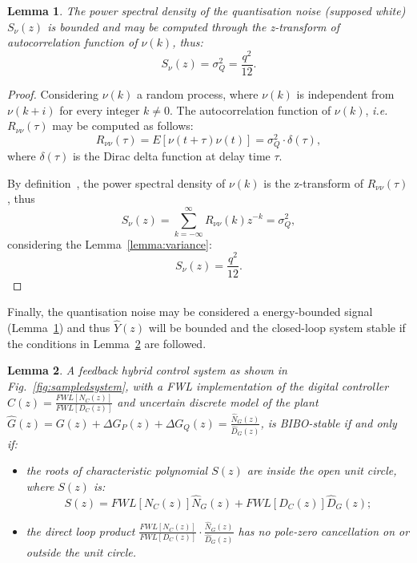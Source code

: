 \documentclass{sig-alternate-05-2015}
\newtheorem{mylemma}{Lemma}
\begin{document}
\begin{mylemma}
\label{lemma:boundednoise}
The power spectral density of the quantisation noise (supposed white) $S_{\nu}(z)$ is bounded and may be computed through the z-transform of autocorrelation function of $\nu(k)$, thus:
\begin{equation}
S_{\nu}(z)= \sigma_{Q}^{2}=\frac{q^{2}}{12}.
\end{equation}
\end{mylemma}

\begin{proof}
Considering $\nu(k)$ a random process, where $\nu(k)$ is independent from $\nu(k+i)$ for every  integer $k\neq 0$. The autocorrelation function of $\nu(k)$, {\it i.e.} $R_{\nu\nu}(\tau)$ may be computed as follows:
\begin{equation}
R_{\nu\nu}(\tau)=E[\nu(t+\tau)\nu(t)]=\sigma_{Q}^{2}\cdot \delta(\tau),
\end{equation}
where $\delta(\tau)$ is the Dirac delta function at delay time $\tau$.

By definition~\cite{poularikas2000transforms}, the power spectral density of  $\nu(k)$ is the z-transform of $R_{\nu\nu}(\tau)$, thus
\begin{equation}
S_{\nu}(z)=  \sum\limits_{k=-\infty}^{\infty}{R_{\nu\nu}(k)z^{-k}} = \sigma_{Q}^{2},
\end{equation}
considering the Lemma~\ref{lemma:variance}:
\begin{equation}
S_{\nu}(z)=  \frac{q^{2}}{12}.
\end{equation}
\end{proof}

Finally, the quantisation noise may be considered a energy-bounded signal (Lemma~\ref{lemma:boundednoise}) and thus $\hat{Y}(z)$ will be bounded and the closed-loop system stable if the conditions in Lemma~\ref{lemma:eq_int_stab} are followed.


\begin{mylemma}{\cite{Bessa16,fadali}}
\label{lemma:eq_int_stab} 
A feedback hybrid control system as shown in Fig.~\ref{fig:sampledsystem}, with a FWL implementation of the digital controller $\hat{C}(z) = \frac{FWL[N_{C}(z)]}{FWL[D_{C}(z)]}$ and uncertain discrete model of the plant $\hat{G}(z)=G(z)+\Delta G_{P}(z)+\Delta G_{Q}(z)=\frac{\hat{N}_{G}(z)}{\hat{D}_{G}(z)}$, is BIBO-stable if and only if: 
\begin{itemize}
\item  the roots of characteristic polynomial $S(z)$ are inside the open unit circle, where $S(z)$ is:
\begin{equation}
\label{eq:internal_stab_lemma}
S(z)=FWL[N_{C}(z)]\hat{N}_{G}(z)+FWL[D_{C}(z)]\hat{D}_{G}(z);
\end{equation}
\item the direct loop product $\frac{FWL[N_{C}(z)]}{FWL[D_{C}(z)]}\cdot \frac{\hat{N}_{G}(z)}{\hat{D}_{G}(z)}$ has no pole-zero cancellation on or outside the unit circle.
\end{itemize}
\end{mylemma}
\end{document}
